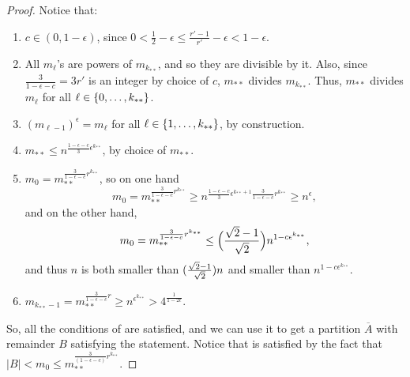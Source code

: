 \begin{theorem}
\begin{proof}
                Notice that:
                \begin{enumerate}[label={\roman*}., ref={\roman*}, font=\rmfamily]
                    \item $c \in (0, 1 - \epsilon)$, since $0 < \frac{1}{2} - \epsilon \leq \frac{r'-1}{r'} - \epsilon < 1 - \epsilon$.
                    \item All $m_\ell$'s are powers of $m_{k_{**}}$, and so they are divisible by it.
                        Also, since $\frac{3}{1-\epsilon-c} = 3r'$ is an integer
                        by choice of $c$, $m_{**}$ divides $m_{k_{**}}$.
                        Thus, $m_{**}$ divides $m_\ell$ for all $\ell \in \{ 0, \dots, k_{**} \}$.
                    \item $(m_{\ell-1})^\epsilon = m_\ell$ for all $\ell \in \{ 1, \dots, k_{**} \}$, by construction.
                    \item $m_{**} \leq n^{\frac{1-\epsilon-c}{3}\epsilon^{k_{**}}}$, by choice of $m_{**}$.
                    \item $m_0 = m_{**}^{\frac{3}{1-\epsilon-c}r^{k_{**}}}$, so on one hand
                        \[
                            m_0 = m_{**}^{\frac{3}{1-\epsilon-c}r^{k_{**}}} \geq n^{\frac{1-\epsilon-c}{3}\epsilon^{k_{**}+1} \frac{3}{1-\epsilon-c}r^{k_{**}}}
                                \geq n^{\epsilon},
                        \]
                        and on the other hand,
                        \[
                            m_0 = m_{**}^{\frac{3}{1-\epsilon-c}r^{k_{**}}} \leq \Bigl( \frac{\sqrt{2}-1}{\sqrt{2}} \Bigr) n^{1 - c \epsilon^{k_{**}}},
                        \]
                        and thus $n$ is both smaller than $( \frac{\sqrt{2}-1}{\sqrt{2}} ) n$ and
                        smaller than $n^{1 - c \epsilon^{k_{**}}}$.
                    \item $m_{k_{**}-1} = m_{**}^{\frac{3}{1-\epsilon-c}r} \geq n^{\epsilon^{k_{**}}} > 4^{\frac{1}{1-2\epsilon}}$.
                \end{enumerate}
                So, all the conditions of  are satisfied,
                and we can use it to get a partition $\overline{A}$ with remainder $B$ satisfying the statement.
                Notice that 
                is satisfied by the fact that $|B| < m_0 \leq m_{**}^{\frac{3}{(1-\epsilon-c)}r^{k_{**}}}$.
            \end{proof}
        \end{theorem}

